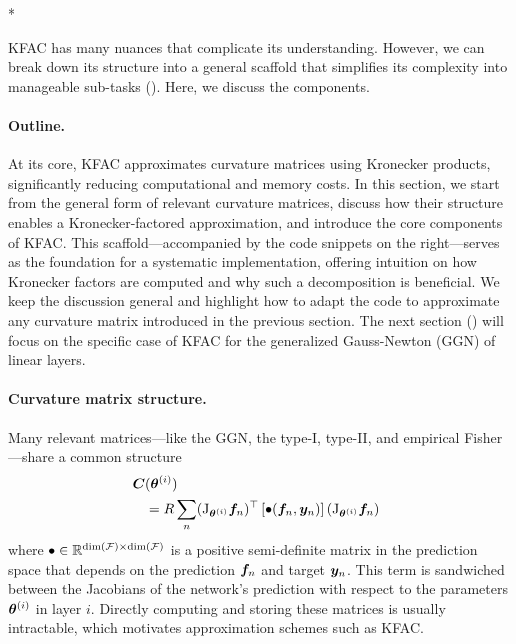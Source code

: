 \switchcolumn[1]*
\switchcolumn[0]

KFAC has many nuances that complicate its understanding.
However, we can break down its structure into a general scaffold that simplifies its complexity into manageable sub-tasks ().
Here, we discuss the components.

\paragraph{Outline.} At its core, KFAC approximates curvature matrices using Kronecker products, significantly reducing computational and memory costs.
In this section, we start from the general form of relevant curvature matrices, discuss how their structure enables a Kronecker-factored approximation, and introduce the core components of KFAC.
This scaffold---accompanied by the code snippets on the right---serves as the foundation for a systematic implementation, offering intuition on how Kronecker factors are computed and why such a decomposition is beneficial.
We keep the discussion general and highlight how to adapt the code to approximate any curvature matrix introduced in the previous section.
The next section () will focus on the specific case of KFAC for the generalized Gauss-Newton (GGN) of linear layers.

\paragraph{Curvature matrix structure.} Many relevant matrices---like the GGN, the type-I, type-II, and empirical Fisher---share a common structure
\begin{align}\label{eq:common-structure}
  \begin{split}
    \!\!{\bm{C}}&({\bm{\theta}}^{(i)}) \\
           &= R \sum_n
             (\mathrm{J}_{{\bm{\theta}}^{(i)}} {\bm{f}}_n)^{\top}
             \left[ \bullet({\bm{f}}_n, {\bm{y}}_n) \right]
             (\mathrm{J}_{{\bm{\theta}}^{(i)}} {\bm{f}}_n)\,
  \end{split}
\end{align}
where $\bullet \in {\mathbb{R}}^{\dim({\mathcal{F}}) \times \dim({\mathcal{F}})}$ is a positive semi-definite matrix in the prediction space that depends on the prediction ${\bm{f}}_n$ and target ${\bm{y}}_n$.
This term is sandwiched between the Jacobians of the network's prediction with respect to the parameters ${\bm{\theta}}^{(i)}$ in layer $i$.
Directly computing and storing these matrices is usually intractable, which motivates approximation schemes such as KFAC.
